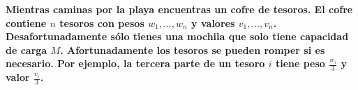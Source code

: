 \textbf{Mientras caminas por la playa encuentras un cofre de tesoros. El cofre contiene $n$ tesoros con pesos $w_1, \dots, w_n$ y valores $v_1, \dots, v_n$. Desafortunadamente sólo tienes una mochila que solo tiene capacidad de carga $M$. Afortunadamente los tesoros se pueden romper si es necesario. Por ejemplo, la tercera parte de un tesoro $i$ tiene peso $\frac{w_i}{3}$ y valor $\frac{v_i}{3}$.}\vspace{.2cm}

\textcolor{bibi}{}
\begin{quote}
\end{quote}